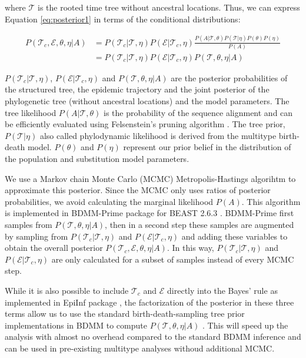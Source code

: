 where $\mathcal{T}$ is the rooted time tree without ancestral locations. Thus, we can express Equation \ref{eq:posterior1} in terms of the conditional distributions:

\begin{align}
P(\mathcal{T}_c, \mathcal{E}, \theta, \eta | A) &= P(\mathcal{T}_c|\mathcal{T}, \eta) P(\mathcal{E}|\mathcal{T}_c, \eta) \frac{P(A | \mathcal{T}, \theta) P(\mathcal{T} | \eta) P(\theta) P(\eta)}{P(A)}\\
&= P(\mathcal{T}_c|\mathcal{T}, \eta) P(\mathcal{E}|\mathcal{T}_c, \eta) P(\mathcal{T}, \theta, \eta | A)
\label{eq:posterior2}
\end{align}

$P(\mathcal{T}_c|\mathcal{T}, \eta)$, $P(\mathcal{E}|\mathcal{T}_c, \eta)$ and $P(\mathcal{T}, \theta, \eta | A)$ are the posterior probabilities of the structured tree, the epidemic trajectory and the joint posterior of the phylogenetic tree (without ancestral locations) and the model parameters. The tree likelihood $P(A | \mathcal{T},\theta )$ is the probability of the sequence alignment and can be efficiently evaluated using Felsenstein’s pruning algorithm \cite{Felsenstein1981}. The tree prior, $P(\mathcal{T} | \eta)$ also called phylodynamic likelihood is derived from the multitype birth-death model. $P(\theta)$ and $P(\eta)$ represent our prior belief in the distribution of the population and substitution model parameters. 

We use a Markov chain Monte Carlo (MCMC) Metropolis-Hastings algorihtm to approximate this posterior. Since the MCMC only uses ratios of posterior probabilities, we avoid calculating the marginal likelihood $P(A)$. This algorithm is implemented in BDMM-Prime package \cite{bdmmp} for BEAST 2.6.3 \cite{Bouckaert2019}. BDMM-Prime first samples from $P(\mathcal{T}, \theta, \eta | A)$, then in a second step these samples are augmented by sampling from $P(\mathcal{T}_c|\mathcal{T}, \eta)$ and $P(\mathcal{E}|\mathcal{T}_c, \eta) $ and adding these variables to obtain the overall posterior $P(\mathcal{T}_c, \mathcal{E}, \theta, \eta | A)$. In this way, $P(\mathcal{T}_c|\mathcal{T}, \eta)$ and $P(\mathcal{E}|\mathcal{T}_c, \eta) $  are only calculated for a subset of samples instead of every MCMC step.


While it is also possible to include $\mathcal{T}_c$ and $\mathcal{E}$ directly into the Bayes' rule as implemented in EpiInf package \cite{Vaughan2019}, the factorization of the posterior in these three terms allow us to use the standard birth-death-sampling tree prior implementations in BDMM to compute $P(\mathcal{T}, \theta, \eta | A)$ \cite{Kuhnert2016} \cite{Scire2020}. This will speed up the analysis with almost no overhead compared to the standard BDMM inference and can be used in pre-existing multitype analyses withoud additional MCMC.\\

